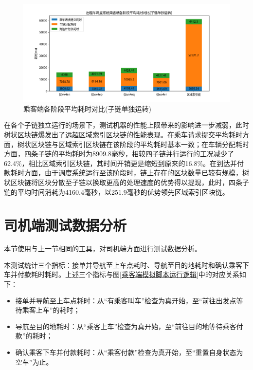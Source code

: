 \begin{figure}[htbp]
    \centering
    \includegraphics[width=\textwidth]{images/乘客端测试-独立.png}
    \caption{乘客端各阶段平均耗时对比(子链单独运转)}\label{乘客端耗时对比(子链独立运行)} %
\end{figure}

在各个子链独立运行的场景下，测试机器的性能上限带来的影响进一步减弱，此时树状区块链爆发出了远超区域索引区块链的性能表现。在乘车请求提交平均耗时方面，树状区块链与区域索引区块链在该阶段的平均耗时基本一致；在车辆分配耗时方面，四条子链的平均耗时为8909.8毫秒，相较四子链并行运行的工况减少了62.4\%，相比区域索引区块链，其时间开销更是缩短到原来的16.8\%。在到达并付款耗时方面，由于调度系统运行至该阶段时，链上存在的区块数量已较有规模，树状区块链将区块分散至子链以换取更高的处理速度的优势得以提现，此时，四条子链的平均时间消耗为4160.4毫秒，以251.9毫秒的优势领先区域索引区块链。

\section{司机端测试数据分析}

本节使用与上一节相同的工具，对司机端方面进行测试数据分析。

本测试统计三个指标：接单并导航至上车点耗时、导航至目的地耗时和确认乘客下车并付款耗时耗时。上述三个指标与图\ref{乘客端模拟脚本运行逻辑}中的对应关系如下：

\begin{itemize}
    \item 接单并导航至上车点耗时：从“有乘客叫车”检查为真开始，至“前往出发点等待乘客上车”的耗时；
    \item 导航至目的地耗时：从“乘客上车”检查为真开始，至“前往目的地等待乘客付款”的耗时；
    \item 确认乘客下车并付款耗时：从“乘客付款”检查为真开始，至“重置自身状态为空车”为止。
\end{itemize}

